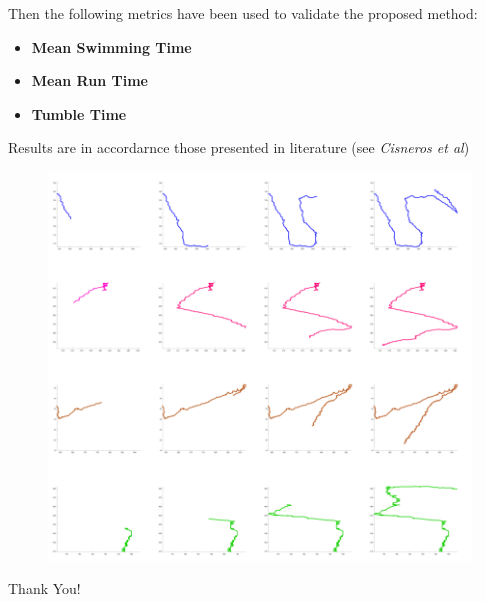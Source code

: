\documentclass{beamer}
\begin{document}
\begin{frame}
\begin{center}
Then the following metrics have been used to validate the proposed method:
\begin{center}
	\begin{itemize}
		
		\item \textbf{Mean Swimming Time}
		\item \textbf{Mean Run Time}
		\item \textbf{Tumble Time}
	\end{itemize}
\end{center}
Results are in accordarnce those presented in literature (see \textit{Cisneros et al})


\end{center}
\end{frame}



\begin{frame}
\begin{center}
\begin{figure}
	\centering
					\includegraphics[scale=0.25]{./images/traj.png}
					
\end{figure}

\end{center}
\end{frame}

\begin{frame}
\begin{center}
\centering
{}
				


\end{center}
\end{frame}


\begin{frame}
\begin{center}
{\fontsize{40}{50}\selectfont Thank You!}
\end{center}
\end{frame}
\end{document}
